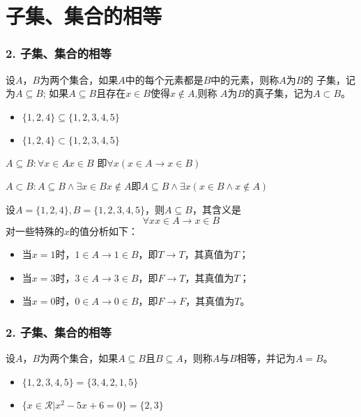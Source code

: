 \documentclass{beamer}
\begin{document}
\begin{CJK*}{UTF8}{gbsn}
\begin{frame}
\end{frame}

\section{子集、集合的相等}
\begin{frame}
  \frametitle{2. 子集、集合的相等}

  \begin{Def}\justifying\let\raggedright\justifying
    设$A$，$B$为两个集合，如果$A$中的每个元素都是$B$中的元素，则称$A$为$B$的
\alert{子集}，记为$A \subseteq B$; 如果$A \subseteq B$且存在$x\in B$使得$x \notin A$,则称 $A$为$B$的\alert{真子集}，记为$A\subset B$。    
\end{Def}
  \begin{itemize}
\pause
  \item   $\{1,2,4\} \subseteq \{1,2,3,4,5\}$
\pause
\item $\{1,2,4\} \subset \{1,2,3,4,5\}$
  \end{itemize}
  \pause
  $A\subseteq B: \forall x \in A x \in B$ 即$\forall x (x \in A \to x \in B)$
  
  

  \pause
  $A\subset B: A \subseteq B \land \exists x\in B x \notin A$即$A \subseteq B \land \exists x (x\in B \land x \notin A)$
\end{frame}
\begin{frame}
  设$A=\{1,2,4\},B=\{1,2,3,4,5\}$，则$A\subseteq B$，其含义是
  \[\forall x x \in A \to x \in B\]
对一些特殊的$x$的值分析如下：
    \begin{itemize}
      \pause
    \item 当$x = 1$时，$1 \in A \to 1 \in B$，即$T \to T$，其真值为$T$；
    \pause
    \item 当$x = 3$时，$3 \in A \to 3 \in B$，即$F \to T$，其真值为$T$；
    \pause
    \item 当$x = 0$时，$0 \in A \to 0 \in B$，即$F \to F$，其真值为$T$。
    \end{itemize}
\end{frame}
\begin{frame}
  \frametitle{2. 子集、集合的相等}
  \begin{Def}
    设$A$，$B$为两个集合，如果$A \subseteq B$且$B \subseteq A$，则称$A$与$B$\alert{相等}，并记为$A=B$。
  \end{Def}
    \begin{itemize}
\pause
  \item   $\{1,2,3,4,5\} = \{3,4,2,1,5\}$
\pause
\item $\{x \in \mathcal{R} | x^2 -5x + 6 = 0\} = \{2,3\}$
  \end{itemize}


\end{frame}
\end{CJK*}
\end{document}
